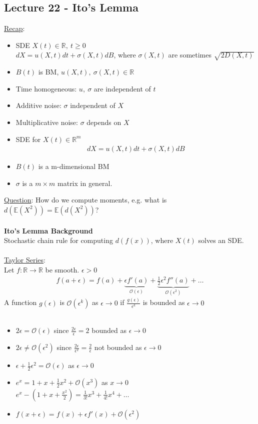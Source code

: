 \documentclass[12pt, letterpaper]{article}
\begin{document}
\subsection{Lecture 22 - Ito's Lemma}
\underline{Recap}:
\begin{itemize}
    \item SDE $X(t) \in \mathbb{R},\ t \ge 0$ \\
    $dX = u(X,t)dt + \sigma(X,t)dB$, where $\sigma(X,t)$ are sometimes $\sqrt{2D(X,t)}$
    \item $B(t)$ is BM, $u(X,t),\ \sigma(X,t) \in \mathbb{R}$
    \item Time homogeneous: $u,\ \sigma$ are independent of $t$
    \item Additive noise: $\sigma$ independent of $X$
    \item Multiplicative noise: $\sigma$ depends on $X$
    \item SDE for $X(t) \in \mathbb{R}^m$
    \begin{align*}
        dX = u(X,t)dt + \sigma(X,t)dB
    \end{align*}
    \item $B(t)$ is a m-dimensional BM
    \item $\sigma$ is a $m\times m$ matrix in general.
\end{itemize}
\underline{Question}: How do we compute moments, e.g. what is 
$d(\mathbb{E}(X^2)) = \mathbb{E}(d(X^2))$? \\ \\
\textbf{Ito's Lemma Background} \\
Stochastic chain rule for computing $d(f(x))$, where $X(t)$ solves an SDE. \\ \\
\underline{Taylor Series}: \\
Let $f:\mathbb{R} \rightarrow \mathbb{R}$ be smooth. $\epsilon > 0$ 
\begin{align*}
    f(a + \epsilon) = f(a) + \underbrace{\epsilon f'(a)}_{\mathcal{O}(\epsilon)} + \underbrace{\frac 12 \epsilon^2f''(a)}_{\mathcal{O}(\epsilon^2)}+\dots
\end{align*}
A function $g(\epsilon)$ is $\mathcal{O}(\epsilon^k)$ as $\epsilon \rightarrow 0$ if $\frac{g(\epsilon)}{\epsilon^k}$
is bounded as $\epsilon \rightarrow 0$ \\ \\
\begin{itemize}
    \item $2\epsilon = \mathcal{O}(\epsilon)$ since $\frac{2\epsilon}{\epsilon} = 2$ bounded as 
    $\epsilon \rightarrow 0$
    \item $2\epsilon \ne \mathcal{O}(\epsilon^2)$ since $\frac{2\epsilon}{\epsilon^2}= \frac{2}{\epsilon}$
    not bounded as $\epsilon \rightarrow 0$
    \item $\epsilon + \frac 12 \epsilon^2 = \mathcal{O}(\epsilon)$ as $\epsilon \rightarrow 0$ 
    \item $e^x = 1+x+\frac12 x^2+ \mathcal{O}(x^3)$ as $x\rightarrow 0$ \\
    $e^x - (1+ x + \frac {x^2}2) = \frac 1{3!}x^3 + \frac 1{4!}x^4 + \dots$
    \item $f(x+\epsilon) = f(x) + \epsilon f'(x) + \mathcal{O}(\epsilon^2)$
\end{itemize}
\end{document}

